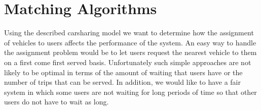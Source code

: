 \documentclass[letterpaper]{article}
\begin{document}
\section{Matching Algorithms}

Using the described carsharing model we want to determine how the assignment of vehicles to users affects the performance of the system. An easy way to handle the assignment problem would be to let users request the nearest vehicle to them on a first come first served basis. Unfortunately such simple approaches are not likely to be optimal in terms of the amount of waiting that users have or the number of trips that can be served. In addition, we would like to have a fair system in which some users are not waiting for long periods of time so that other users do not have to wait as long.
\end{document}
